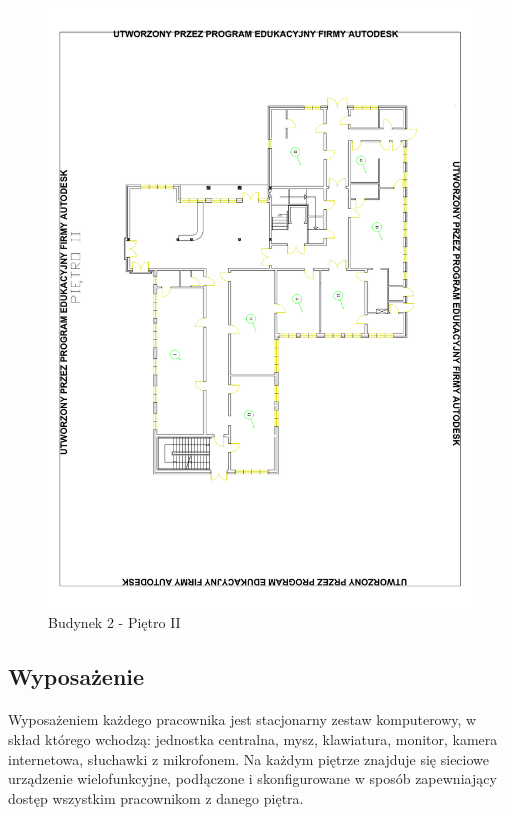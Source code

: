 \begin{figure}[H]
  \begin{center}
    \includegraphics[width=\textwidth]{img/b2-2.pdf}
    \caption{Budynek 2 - Piętro II}
  \end{center}
\end{figure}


\newpage





\subsection{Wyposażenie}
\paragraph{}
Wyposażeniem każdego pracownika jest stacjonarny zestaw komputerowy, w skład którego wchodzą: jednostka centralna, mysz, klawiatura, monitor, kamera internetowa, słuchawki z mikrofonem.
Na każdym piętrze znajduje się sieciowe urządzenie wielofunkcyjne, podłączone i skonfigurowane w sposób zapewniający dostęp wszystkim pracownikom z danego piętra.

